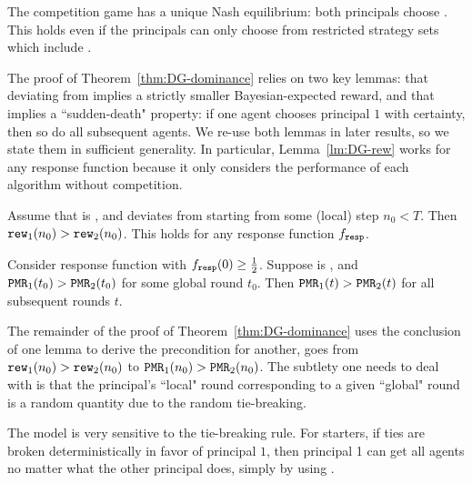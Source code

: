 \begin{corollary}\label{cor:DG-dominance}
The competition game has a unique Nash equilibrium: both principals choose \DynGreedy. This holds even if the principals can only choose from restricted strategy sets which include \DynGreedy.
\end{corollary}

The proof of Theorem~\ref{thm:DG-dominance} relies on two key lemmas: that deviating from \DynGreedy implies a strictly smaller Bayesian-expected reward, and that \HardMax implies a ``sudden-death" property: if one agent chooses principal $1$ with certainty, then so do all subsequent agents. We re-use both lemmas in later results, so we state them in sufficient generality. In particular, Lemma~\ref{lm:DG-rew} works for any response function because it only considers the performance of each algorithm without competition.


\begin{lemma}\label{lm:DG-rew}
Assume that \alg[1] is \DynGreedy, and \alg[2] deviates from \DynGreedy starting from some (local) step $n_0<T$. Then $\mathtt{rew}_1(n_0)>\mathtt{rew}_2(n_0)$. This holds for any response function $f_{\mathtt{resp}}$.
\end{lemma}


\begin{lemma}\label{lm:DG-sudden}
Consider \HardMax response function with $f_{\mathtt{resp}}(0)\geq\tfrac12$.
Suppose \alg[1] is \bmonotone, and $\mathtt{PMR}_1(t_0)>\mathtt{PMR}_2(t_0)$ for some global round $t_0$. Then $\mathtt{PMR}_1(t)>\mathtt{PMR}_2(t)$ for all subsequent rounds $t$.
\end{lemma}

The remainder of the proof of Theorem~\ref{thm:DG-dominance} uses the conclusion of one lemma to derive the precondition for another, \ie goes from $\mathtt{rew}_1(n_0)>\mathtt{rew}_2(n_0)$ to $\mathtt{PMR}_1(n_0)>\mathtt{PMR}_2(n_0)$. The subtlety one needs to deal with is that the principal's ``local" round corresponding to a given ``global" round is a random quantity due to the random tie-breaking.


The \HardMax model is very sensitive to the tie-breaking rule. For starters, if ties are  broken deterministically in favor of principal $1$, then principal 1 can get all agents no matter what the other principal does, simply by using \StaticGreedy.

